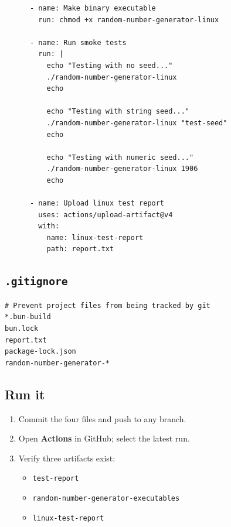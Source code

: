 \documentclass[11pt]{article}
\begin{document}
\begin{verbatim}
      - name: Make binary executable
        run: chmod +x random-number-generator-linux

      - name: Run smoke tests
        run: |
          echo "Testing with no seed..."
          ./random-number-generator-linux
          echo

          echo "Testing with string seed..."
          ./random-number-generator-linux "test-seed"
          echo

          echo "Testing with numeric seed..."
          ./random-number-generator-linux 1906
          echo

      - name: Upload linux test report
        uses: actions/upload-artifact@v4
        with:
          name: linux-test-report
          path: report.txt
\end{verbatim}

\subsection{\texttt{.gitignore}}
\begin{verbatim}
# Prevent project files from being tracked by git
*.bun-build
bun.lock
report.txt
package-lock.json
random-number-generator-*
\end{verbatim}

\subsection*{Run it}
\begin{enumerate}
  \item Commit the four files and push to any branch.
  \item Open \textbf{Actions} in GitHub; select the latest run.
  \item Verify three artifacts exist:
  \begin{itemize}
    \item \texttt{test-report}
    \item \texttt{random-number-generator-executables}
    \item \texttt{linux-test-report}
  \end{itemize}
\end{enumerate}

\end{document}
